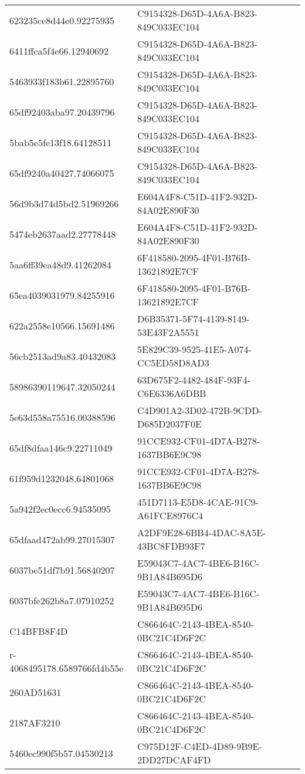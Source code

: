 \begin{tabular}{ll}
623235ce8d44e0.92275935 & C9154328-D65D-4A6A-B823-849C033EC104 \\
6411ffca5f4e66.12940692 & C9154328-D65D-4A6A-B823-849C033EC104 \\
5463933f183b61.22895760 & C9154328-D65D-4A6A-B823-849C033EC104 \\
65df92403aba97.20439796 & C9154328-D65D-4A6A-B823-849C033EC104 \\
5bab5e5fe13f18.64128511 & C9154328-D65D-4A6A-B823-849C033EC104 \\
65df9240a40427.74066075 & C9154328-D65D-4A6A-B823-849C033EC104 \\
56d9b3d74d5bd2.51969266 & E604A4F8-C51D-41F2-932D-84A02E890F30 \\
5474eb2637aad2.27778448 & E604A4F8-C51D-41F2-932D-84A02E890F30 \\
5aa6ff39ea48d9.41262084 & 6F418580-2095-4F01-B76B-13621892E7CF \\
65ea4039031979.84255916 & 6F418580-2095-4F01-B76B-13621892E7CF \\
622a2558e10566.15691486 & D6B35371-5F74-4139-8149-53E43F2A5551 \\
56cb2513ad9a83.40432083 & 5E829C39-9525-41E5-A074-CC5ED58D8AD3 \\
58986390119647.32050244 & 63D675F2-4482-484F-93F4-C6E6336A6DBB \\
5e63d558a75516.00388596 & C4D901A2-3D02-472B-9CDD-D685D2037F0E \\
65df8dfaa146c9.22711049 & 91CCE932-CF01-4D7A-B278-1637BB6E9C98 \\
61f959d1232048.64801068 & 91CCE932-CF01-4D7A-B278-1637BB6E9C98 \\
5a942f2ec0ecc6.94535095 & 451D7113-E5D8-4CAE-91C9-A61FCE8976C4 \\
65dfaad472ab99.27015307 & A2DF9E28-6BB4-4DAC-8A5E-43BC8FDB93F7 \\
6037be51df7b91.56840207 & E59043C7-4AC7-4BE6-B16C-9B1A84B695D6 \\
6037bfe262b8a7.07910252 & E59043C7-4AC7-4BE6-B16C-9B1A84B695D6 \\
C14BFB8F4D & C866464C-2143-4BEA-8540-0BC21C4D6F2C \\
r-4068495178.6589766fd4b55e & C866464C-2143-4BEA-8540-0BC21C4D6F2C \\
260AD51631 & C866464C-2143-4BEA-8540-0BC21C4D6F2C \\
2187AF3210 & C866464C-2143-4BEA-8540-0BC21C4D6F2C \\
5460ec990f5b57.04530213 & C975D12F-C4ED-4D89-9B9E-2DD27DCAF4FD \\

\end{tabular}

